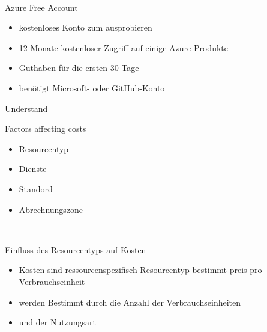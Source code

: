 \documentclass{scrartcl}
\newenvironment{flashcard}[2][]{%
    #1
    \vfill
    \centerline{\Large{#2}}
    \vfill
\newpage
}
{\newpage}
\begin{document}
    \begin{flashcard}[\ ]{Azure Free Account}
        \begin{itemize}
            \item kostenloses Konto zum ausprobieren
            \item 12 Monate kostenloser Zugriff auf einige Azure-Produkte
            \item Guthaben für die ersten 30 Tage
            \item benötigt Microsoft- oder GitHub-Konto
        \end{itemize}

    \end{flashcard}

    \begin{flashcard}[Understand]{Factors affecting costs}
        \begin{itemize}
            \item Resourcentyp
            \item Dienste
            \item Standord
            \item Abrechnungszone
        \end{itemize}

    \end{flashcard}

    \begin{flashcard}[\ ]{Einfluss des Resourcentyps auf Kosten}
        \begin{itemize}
            \item Kosten sind ressourcenspezifisch\newline
            Resourcentyp bestimmt preis pro Verbrauchseinheit
            \item werden Bestimmt durch die Anzahl der Verbrauchseinheiten
            \item und der Nutzungsart
        \end{itemize}

    \end{flashcard}
\end{document}

